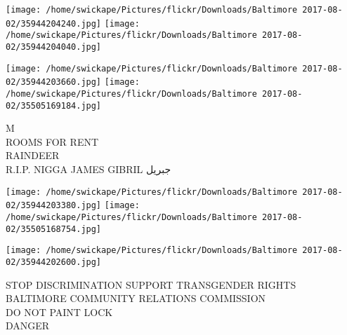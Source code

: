 \documentclass[10pt,letterpaper]{article}
\begin{document}
\texttt{[image: /home/swickape/Pictures/flickr/Downloads/Baltimore 2017-08-02/35944204240.jpg]}
\texttt{[image: /home/swickape/Pictures/flickr/Downloads/Baltimore 2017-08-02/35944204040.jpg]}

\texttt{[image: /home/swickape/Pictures/flickr/Downloads/Baltimore 2017-08-02/35944203660.jpg]}
\texttt{[image: /home/swickape/Pictures/flickr/Downloads/Baltimore 2017-08-02/35505169184.jpg]}

M\\
ROOMS FOR RENT\\
RAINDEER\\
R.I.P. NIGGA JAMES GIBRIL جبريل\\
\pagebreak

\texttt{[image: /home/swickape/Pictures/flickr/Downloads/Baltimore 2017-08-02/35944203380.jpg]}
\texttt{[image: /home/swickape/Pictures/flickr/Downloads/Baltimore 2017-08-02/35505168754.jpg]}

\texttt{[image: /home/swickape/Pictures/flickr/Downloads/Baltimore 2017-08-02/35944202600.jpg]}

STOP DISCRIMINATION SUPPORT TRANSGENDER RIGHTS BALTIMORE COMMUNITY RELATIONS COMMISSION\\
DO NOT PAINT LOCK\\
DANGER\\
\pagebreak
\end{document}
